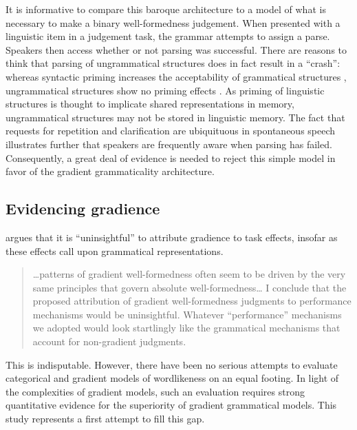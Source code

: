 It is informative to compare this baroque architecture to a model of what is necessary to make a binary well-formedness judgement. When presented with a linguistic item in a judgement task, the grammar attempts to assign a parse. Speakers then access whether or not parsing was successful. 
There are reasons to think that parsing of ungrammatical structures does in fact result in a ``crash'': whereas syntactic priming increases the acceptability of grammatical structures \citep{Luka2005}, ungrammatical structures show no priming effects \citep{Sprouse2007b}. 
As priming of linguistic structures is thought to implicate shared representations in memory, ungrammatical structures may not be stored in linguistic memory. 
The fact that requests for repetition and clarification are ubiquituous in spontaneous speech illustrates further that speakers are frequently aware when parsing has failed.
Consequently, a great deal of evidence is needed to reject this simple model in favor of the gradient grammaticality architecture. 

\subsection{Evidencing gradience}

\citet{Hayes2000} argues that it is ``uninsightful'' to attribute gradience to task effects, insofar as these effects call upon grammatical representations. 


\begin{quote}
\ldots{}patterns of gradient well-formedness often seem to be driven by the very same principles that govern absolute well-formedness\ldots{} I conclude that the proposed attribution of gradient well-formedness judgments to performance mechanisms would be uninsightful. Whatever ``performance'' mechanisms we adopted would look startlingly like the grammatical mechanisms that account for non-gradient judgments. \citep[99]{Hayes2000}
\end{quote}

\noindent
This is indisputable. 
However, there have been no serious attempts to evaluate categorical and gradient models of wordlikeness on an equal footing.
In light of the complexities of gradient models, such an evaluation requires strong quantitative evidence for the superiority of gradient grammatical models.
This study represents a first attempt to fill this gap.

